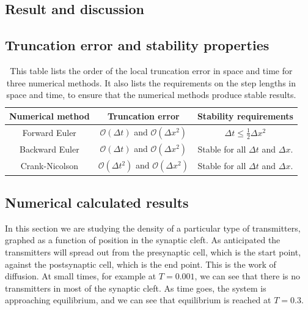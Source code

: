 \documentclass[12pt]{article}
\begin{document}
\begin{flushleft}
\section{Result and discussion}
\subsection{Truncation error and stability properties}

\begin{table}[!h]
\begin{center}
\begin{tabular}{| c | c | c |}
	\hline
	\textbf{Numerical method} & \textbf{Truncation error} & \textbf{Stability requirements}\\
	\hline	
	Forward Euler & $\mathcal{O}(\Delta t)$ and $\mathcal{O}(\Delta x^2)$ & $\Delta t \leq \frac{1}{2}\Delta x^2$ \\
		Backward Euler & $\mathcal{O}(\Delta t)$ and $\mathcal{O}(\Delta x^2)$ & Stable for all $\Delta t$ and $\Delta x$.\\
			Crank-Nicolson & $\mathcal{O}(\Delta t^2)$ and $\mathcal{O}(\Delta x^2)$ & Stable for all $\Delta t$ and $\Delta x$.\\
  \hline
\end{tabular}
\end{center}
\caption{\label{tab:error_stability}This table lists the order of the local truncation error in space and time for three numerical methods. It also lists the requirements on the step lengths in space and time, to ensure that the numerical methods produce stable results.}
\end{table}

\subsection{Numerical calculated results\label{sect:numerical_results}}
In this section we are studying the density of a particular type of transmitters, graphed as a function of position in the synaptic cleft. As anticipated the transmitters will spread out from the presynaptic cell, which is the start point, against the postsynaptic cell, which is the end point. This is the work of diffusion. At small times, for example at $T = 0.001$, we can see that there is no transmitters in most of the synaptic cleft. As time goes, the system is approaching equilibrium, and we can see that equilibrium is reached at $T = 0.3$. 


\end{flushleft}
\end{document}
